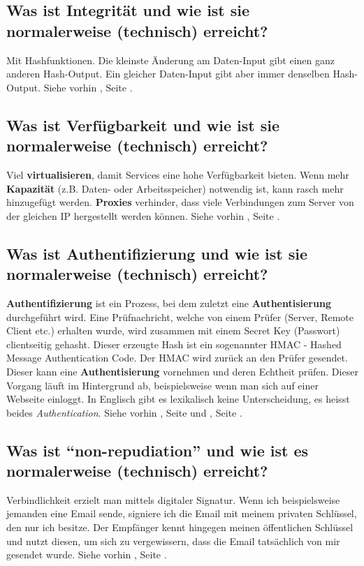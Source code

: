 \subsection*{Was ist Integrität und wie ist sie normalerweise (technisch) erreicht?}
Mit Hashfunktionen. Die kleinste Änderung am Daten-Input gibt einen ganz anderen Hash-Output. Ein gleicher Daten-Input gibt aber immer denselben Hash-Output. Siehe vorhin \underline{}, Seite \pageref{par:Integrity}.

\subsection*{Was ist Verfügbarkeit und wie ist sie normalerweise (technisch) erreicht?}
Viel \textbf{virtualisieren}, damit Services eine hohe Verfügbarkeit bieten. Wenn mehr \textbf{Kapazität} (z.B. Daten- oder Arbeitsspeicher) notwendig ist, kann rasch mehr hinzugefügt werden. \textbf{Proxies} verhinder, dass viele Verbindungen zum Server von der gleichen IP hergestellt werden können. Siehe vorhin \underline{}, Seite \pageref{par:Availability}.

\subsection*{Was ist Authentifizierung und wie ist sie normalerweise (technisch) erreicht?}
\textbf{Authentifizierung} ist ein Prozess, bei dem zuletzt eine \textbf{Authentisierung} durchgeführt wird. Eine Prüfnachricht, welche von einem Prüfer (Server, Remote Client etc.) erhalten wurde, wird zusammen mit einem Secret Key (Passwort) clientseitig gehasht. Dieser erzeugte Hash ist ein sogenannter HMAC - Hashed Message Authentication Code. Der HMAC wird zurück an den Prüfer gesendet. Dieser kann eine \textbf{Authentisierung} vornehmen und deren Echtheit prüfen. Dieser Vorgang läuft im Hintergrund ab, beispielsweise wenn man sich auf einer Webseite einloggt. In Englisch gibt es lexikalisch keine Unterscheidung, es heisst beides \textsl{Authentication}. Siehe vorhin \underline{}, Seite \pageref{par:Authentification} und \underline{}, Seite \pageref{par:Authentication}.

\subsection*{Was ist "`non-repudiation"' und wie ist es normalerweise (technisch) erreicht?}
Verbindlichkeit erzielt man mittels digitaler Signatur. Wenn ich beispielsweise jemanden eine Email sende, signiere ich die Email mit meinem privaten Schlüssel, den nur ich besitze. Der Empfänger kennt hingegen meinen öffentlichen Schlüssel und nutzt diesen, um sich zu vergewissern, dass die Email tatsächlich von mir gesendet wurde. Siehe vorhin \underline{}, Seite \pageref{par:Non-Repudiation}.

